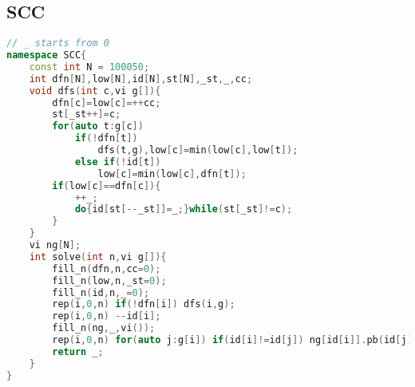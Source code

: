 \subsection{SCC}
\begin{lstlisting}[language=C++]
// _ starts from 0
namespace SCC{
    const int N = 100050;
    int dfn[N],low[N],id[N],st[N],_st,_,cc;
    void dfs(int c,vi g[]){
        dfn[c]=low[c]=++cc;
        st[_st++]=c;
        for(auto t:g[c])
            if(!dfn[t])
                dfs(t,g),low[c]=min(low[c],low[t]);
            else if(!id[t])
                low[c]=min(low[c],dfn[t]);
        if(low[c]==dfn[c]){
            ++_;
            do{id[st[--_st]]=_;}while(st[_st]!=c);
        }
    }
    vi ng[N];
    int solve(int n,vi g[]){
        fill_n(dfn,n,cc=0);
        fill_n(low,n,_st=0);
        fill_n(id,n,_=0);
        rep(i,0,n) if(!dfn[i]) dfs(i,g);
        rep(i,0,n) --id[i];
        fill_n(ng,_,vi());
        rep(i,0,n) for(auto j:g[i]) if(id[i]!=id[j]) ng[id[i]].pb(id[j]);
        return _;
    }
}
\end{lstlisting}
